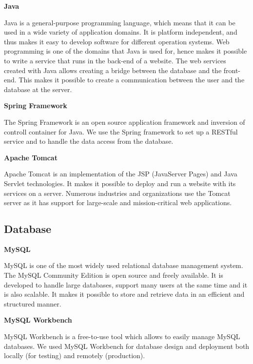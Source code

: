 \textbf{Java} \nocite{Java}

Java is a general-purpose programming language, which means that it can be used in a wide variety of application domains.
It is platform independent, and thus makes it easy to develop software for different operation systems.
Web programming is one of the domains that Java is used for, hence makes it possible to write a service that runs in the back-end of a website.
The web services created with Java allows creating a bridge between the database and the front-end. 
This makes it possible to create a communication between the user and the database at the server.

\textbf{Spring Framework} \nocite{SpringFramework1}\nocite{SpringFramework2}

The Spring Framework is an open source application framework and inversion of controll container for Java. 
We use the Spring framework to set up a RESTful service and to handle the data access from the database. 

\textbf{Apache Tomcat} \nocite{ApacheTomcat}

Apache Tomcat is an implementation of the JSP (JavaServer Pages) and Java Servlet technologies.
It makes it possible to deploy and run a website with its services on a server.
Numerous industries and organizations use the Tomcat server as it has support for large-scale and mission-critical web applications.

\subsection{Database}

\textbf{MySQL} \nocite{MySQL}

MySQL is one of the most widely used relational database management system.
The MySQL Community Edition is open source and freely available.
It is developed to handle large databases, support many users at the same time and it is also scalable.
It makes it possible to store and retrieve data in an efficient and structured manner.

\textbf{MySQL Workbench}

MySQL Workbench is a free-to-use tool which allows to easily manage MySQL databases.
We used MySQL Workbench for database design and deployment both locally (for testing) and remotely (production).


